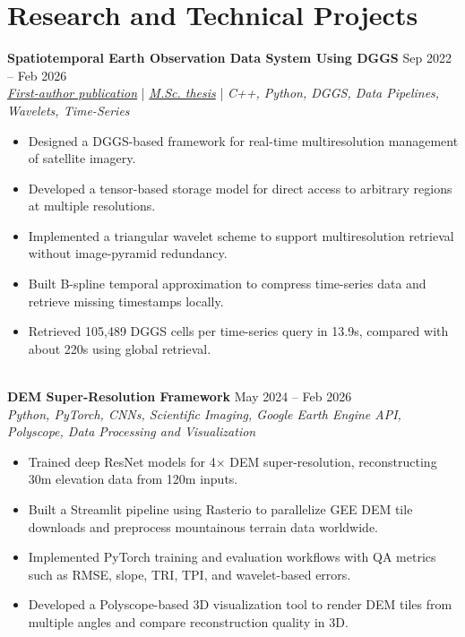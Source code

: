 \documentclass[a4paper,10pt]{article}
\begin{document}

\section*{Research and Technical Projects}

\noindent
\textbf{Spatiotemporal Earth Observation Data System Using DGGS} \hfill Sep 2022 -- Feb 2026 \\
\textit{\href{https://doi.org/10.3390/rs17040570}{First-author publication}} | \textit{\href{https://ucalgary.scholaris.ca/items/114b394b-e516-4732-bd3a-45dd6160d480}{M.Sc. thesis}} | \textit{C++, Python, DGGS, Data Pipelines, Wavelets, Time-Series}
\begin{itemize}[leftmargin=0.25in]
    \item Designed a DGGS-based framework for real-time multiresolution management of satellite imagery.
    \item Developed a tensor-based storage model for direct access to arbitrary regions at multiple resolutions.
    \item Implemented a triangular wavelet scheme to support multiresolution retrieval without image-pyramid redundancy.
    \item Built B-spline temporal approximation to compress time-series data and retrieve missing timestamps locally.
    \item Retrieved 105,489 DGGS cells per time-series query in 13.9s, compared with about 220s using global retrieval.
\end{itemize}

\noindent \\
\textbf{DEM Super-Resolution Framework} \hfill May 2024 -- Feb 2026 \\
\textit{Python, PyTorch, CNNs, Scientific Imaging, Google Earth Engine API, Polyscope, Data Processing and Visualization}
\begin{itemize}[leftmargin=0.25in]
    \item Trained deep ResNet models for 4$\times$ DEM super-resolution, reconstructing 30m elevation data from 120m inputs.
    \item Built a Streamlit pipeline using Rasterio to parallelize GEE DEM tile downloads and preprocess mountainous terrain data worldwide.
    \item Implemented PyTorch training and evaluation workflows with QA metrics such as RMSE, slope, TRI, TPI, and wavelet-based errors.
    \item Developed a Polyscope-based 3D visualization tool to render DEM tiles from multiple angles and compare reconstruction quality in 3D.
\end{itemize}
\end{document}
